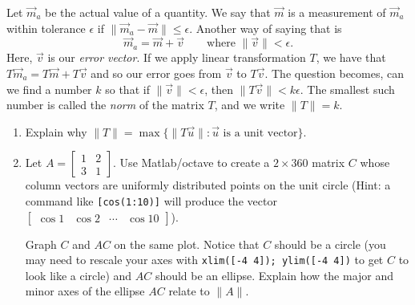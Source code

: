 \documentclass[letter]{article}
\newcommand{\mat}[1]{\begin{bmatrix}#1\end{bmatrix}}
\begin{document}
\begin{enumerate}
			Let $\vec m_a$ be the actual value of a quantity.  We say that $\vec m$ is
			a measurement of $\vec m_a$ within tolerance $\epsilon$ if 
			$\|\vec m_a-\vec m\|\leq \epsilon$.  Another way of saying that is
			\[
				\vec m_a = \vec m + \vec v\qquad\text{where } \|\vec v\|<\epsilon.
			\]
			Here, $\vec v$ is our \emph{error vector}.
			If we apply linear
			transformation $T$, we have that $T\vec m_a = T\vec m + T\vec v$ and so
			our error goes from $\vec v$ to $T\vec v$.  The question becomes, can we find a number
			$k$ so that if $\|\vec v\|<\epsilon$, then $\|T\vec v\|<k\epsilon$.  The smallest
			such number
			is called the \emph{norm} of the matrix $T$, and we write $\|T\|=k$.

			\begin{enumerate}
				\item Explain why $\|T\|=\max \{\|T\vec u\|:\vec u\text{ is a unit vector}\}$.
				\item Let $A=\mat{1&2\\3&1}$.  Use Matlab/octave to 
					create a $2\times 360$ matrix $C$ whose column vectors
					are uniformly distributed points on the unit circle (Hint:
					a command like {\tt [cos(1:10)]} will produce the vector $\mat{\cos 1&\cos 2&\cdots &\cos 10}$).
					
					Graph $C$ and $AC$ on the same plot.  Notice that $C$ 
					should be a circle (you may need to rescale your axes with {\tt xlim([-4 4]); ylim([-4 4])}
					to get $C$ to look like a circle) and $AC$ should be an ellipse.  
					Explain how the major and minor axes of the ellipse $AC$ relate to $\|A\|$.


\end{enumerate}
\end{enumerate}
\end{document}

